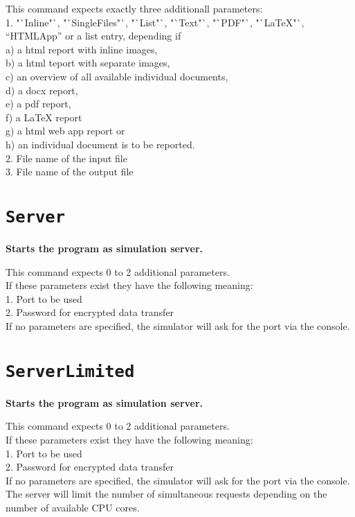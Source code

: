This command expects exactly three additionall parameters:\\
1. "`Inline"`, "`SingleFiles"`, "`List"`, "`Text"`, "`PDF"`, "`LaTeX"`, "`HTMLApp"' or a list entry, depending if\\
a) a html report with inline images,\\
b) a html teport with separate images,\\
c) an overview of all available individual documents,\\
d) a docx report,\\
e) a pdf report,\\
f) a LaTeX report\\
g) a html web app report or\\
h) an individual document is to be reported.\\
2. File name of the input file\\
3. File name of the output file

\section{\texttt{Server}}

\textbf{Starts the program as simulation server.}

This command expects 0 to 2 additional parameters.\\
If these parameters exist they have the following meaning:\\
1. Port to be used\\
2. Password for encrypted data transfer\\
If no parameters are specified, the simulator will ask for the port via the console.

\section{\texttt{ServerLimited}}

\textbf{Starts the program as simulation server.}

This command expects 0 to 2 additional parameters.\\
If these parameters exist they have the following meaning:\\
1. Port to be used\\
2. Password for encrypted data transfer\\
If no parameters are specified, the simulator will ask for the port via the console.\\
The server will limit the number of simultaneous requests depending on the\\
number of available CPU cores.

